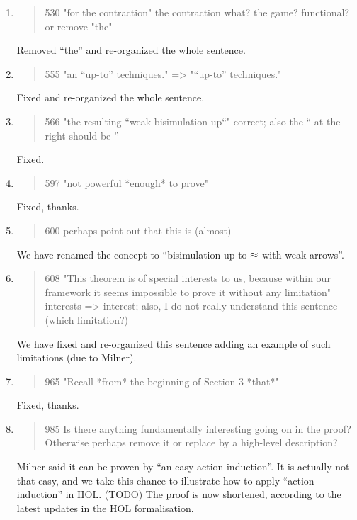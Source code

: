 \begin{enumerate}
  \item \begin{quote}
530 "for the contraction" the contraction what? the game? functional? or remove "the"
\end{quote}
  \Mark Removed ``the'' and re-organized the whole sentence.

  \item \begin{quote}
555 "an “up-to” techniques." => "“up-to” techniques."
\end{quote}
  \Mark Fixed and re-organized the whole sentence.

  \item \begin{quote}
566 "the resulting ``weak bisimulation up``" correct; also the `` at the right should be ''
\end{quote}
  \Mark Fixed.

  \item \begin{quote}
597 "not powerful *enough* to prove" 
\end{quote}
  \Mark Fixed, thanks.

  \item \begin{quote}
600 perhaps point out that this is (almost) 
\end{quote}
  \Mark We have renamed the concept to ``bisimulation up to $\approx$ with weak arrows''.

  \item \begin{quote}
608 "This theorem is of special interests to us, because within our framework it seems impossible to prove it without any limitation" interests => interest; also, I do not really understand this sentence (which limitation?)
\end{quote}
  \Mark We have fixed and re-organized this sentence adding an example
  of such limitations (due to Milner).

  \item \begin{quote}
965 "Recall *from* the beginning of Section 3 *that*"
\end{quote}
  \Mark Fixed, thanks.

  \item \begin{quote}
985 Is there anything fundamentally interesting going on in the proof? Otherwise perhaps remove it or replace by a high-level description?
\end{quote}
  \Mark Milner said it can be proven by ``an easy action induction''.
             It is actually not that easy, and we take this chance to
             illustrate how to apply ``action induction'' in HOL.
             (TODO) The proof is now shortened, according to the
             latest updates in the HOL formalisation.


\end{enumerate}
